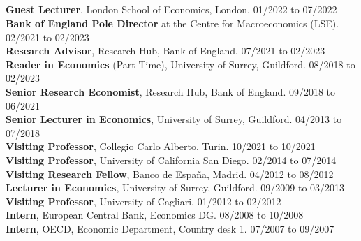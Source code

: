 \documentclass[margin, 11pt]{res} %
\begin{document}
\begin{resume}
\section{}
\textbf{Guest Lecturer}, London School of Economics, London. \hfill 01/2022 to 07/2022\\
\textbf{Bank of England Pole Director} at the Centre for Macroeconomics (LSE).  \hfill  02/2021 to 02/2023\\
\textbf{Research Advisor}, Research Hub, Bank of England. \hfill  07/2021 to 02/2023\\
\textbf{Reader in Economics} (Part-Time), University of Surrey, Guildford. \hfill 08/2018 to 02/2023\\
\textbf{Senior Research Economist}, Research Hub, Bank of England. \hfill  09/2018 to 06/2021\\
\textbf{Senior Lecturer in Economics}, University of Surrey, Guildford. \hfill 04/2013 to 07/2018\\
\textbf{Visiting Professor}, Collegio Carlo Alberto, Turin. \hfill 10/2021 to 10/2021\\
\textbf{Visiting Professor}, University of California San Diego. \hfill 02/2014 to 07/2014\\
\textbf{Visiting Research Fellow}, Banco de Espa\~{n}a, Madrid. \hfill 04/2012 to 08/2012\\
\textbf{Lecturer in Economics}, University of Surrey, Guildford. \hfill 09/2009 to 03/2013\\
\textbf{Visiting Professor}, University of Cagliari. \hfill 01/2012 to 02/2012\\
\textbf{Intern}, European Central Bank, Economics DG. \hfill 08/2008 to 10/2008\\
\textbf{Intern}, OECD, Economic Department, Country desk 1. \hfill 07/2007 to 09/2007







\end{resume}
\end{document}
